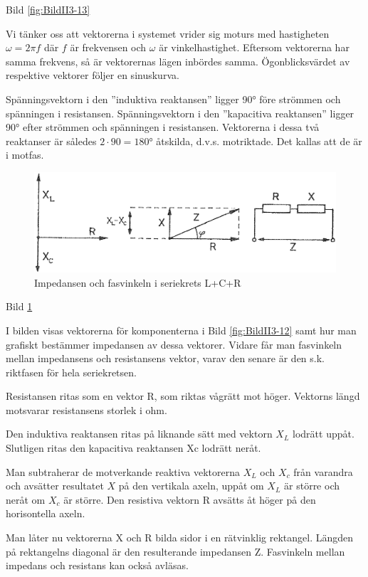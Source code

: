 Bild \ref{fig:BildII3-13}

Vi tänker oss att vektorerna i systemet vrider sig moturs med hastigheten
\(\omega = 2πf\) där \(f\) är frekvensen och \(\omega\) är vinkelhastighet.
Eftersom vektorerna har samma frekvens, så är vektorernas lägen inbördes samma.
Ögonblicksvärdet av respektive vektorer följer en sinuskurva.

Spänningsvektorn i den ''induktiva reaktansen'' ligger 90° före strömmen och
spänningen i resistansen. Spänningsvektorn i den ''kapacitiva reaktansen''
ligger 90° efter strömmen och spänningen i resistansen. Vektorerna i dessa två
reaktanser är således \(2 \cdot 90 = 180°\) åtskilda, d.v.s. motriktade.
Det kallas att de är i motfas.

\begin{figure}
\includegraphics[width=\textwidth]{images/cropped_pdfs/bild_2_3-14.pdf}
\caption{Impedansen och fasvinkeln i seriekrets L+C+R}
\label{fig:BildII3-14}
\end{figure}

Bild \ref{fig:BildII3-14}

I bilden visas vektorerna för komponenterna i Bild \ref{fig:BildII3-12} samt
hur man grafiskt bestämmer impedansen av dessa vektorer. Vidare får man
fasvinkeln mellan impedansens och resistansens vektor, varav den senare är den
s.k. riktfasen för hela seriekretsen.

Resistansen ritas som en vektor R, som riktas vågrätt mot höger. Vektorns längd
motsvarar resistansens storlek i ohm.

Den induktiva reaktansen ritas på liknande sätt med vektorn \(X_L\) lodrätt
uppåt. Slutligen ritas den kapacitiva reaktansen Xc lodrätt neråt.

Man subtraherar de motverkande reaktiva vektorerna \(X_L\) och \(X_c\) från
varandra och avsätter resultatet \(X\) på den vertikala axeln, uppåt om \(X_L\)
är större och neråt om \(X_c\) är större. Den resistiva vektorn R avsätts åt
höger på den horisontella axeln.

Man låter nu vektorerna X och R bilda sidor i en rätvinklig rektangel. Längden
på rektangelns diagonal är den resulterande impedansen Z. Fasvinkeln mellan
impedans och resistans kan också avläsas.

